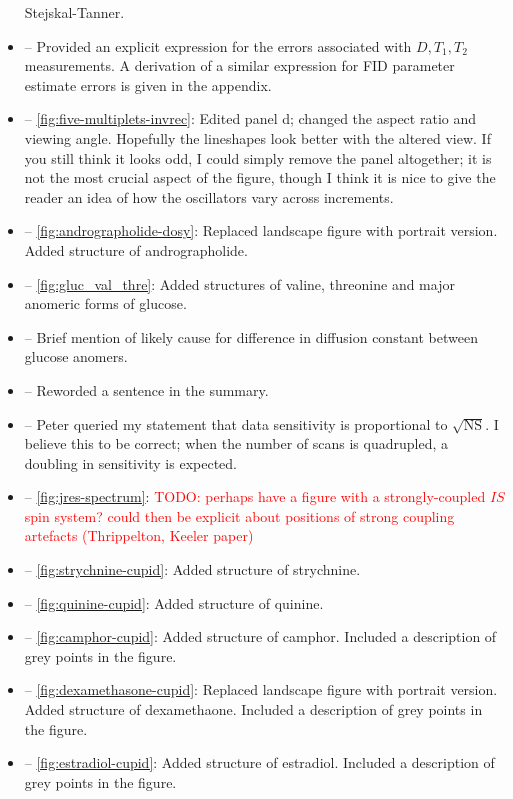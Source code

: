 \documentclass[12pt]{article}
\begin{document}
\begin{itemize}
            Stejskal-Tanner.
        \item {} -- Provided an explicit expression for
            the errors associated with $D, T_1, T_2$ measurements.
            A derivation of a similar expression for FID parameter estimate
            errors is given in the appendix.
        \item {} -- \cref{fig:five-multiplets-invrec}:
            Edited panel d; changed the aspect ratio and viewing angle.
            Hopefully the lineshapes look better with the altered view. If you
            still think it looks odd, I could simply remove the panel
            altogether; it is not the most crucial aspect of the figure, though
            I think it is nice to give the reader an idea of how the
            oscillators vary across increments.
        \item {} -- \cref{fig:andrographolide-dosy}:
            Replaced landscape figure with portrait version. Added structure of
            andrographolide.
        \item {} -- \cref{fig:gluc_val_thre}: Added
            structures of valine, threonine and major anomeric forms of glucose.
        \item {} -- Brief mention of likely cause for
            difference in diffusion constant between glucose anomers.
        \item {} -- Reworded a sentence in the summary.
        \item {} -- Peter queried my statement that data
            sensitivity is proportional to $\sqrt{\text{NS}}$. I believe this
            to be correct; when the number of scans is quadrupled, a doubling
            in sensitivity is expected.
        \item {} -- \cref{fig:jres-spectrum}: \textcolor{red}{TODO:
            perhaps have a figure with a strongly-coupled $IS$ spin system?
            could then be explicit about positions of strong coupling
        artefacts (Thrippelton, Keeler paper)}
        \item {} -- \cref{fig:strychnine-cupid}: Added
            structure of strychnine.
        \item {} -- \cref{fig:quinine-cupid}: Added structure
            of quinine.
        \item {} -- \cref{fig:camphor-cupid}: Added structure
            of camphor. Included a description of grey points in
            the figure.
        \item {} -- \cref{fig:dexamethasone-cupid}:
            Replaced landscape figure with portrait version. Added structure of
            dexamethaone. Included a description of grey points in
            the figure.
        \item {} -- \cref{fig:estradiol-cupid}: Added
            structure of estradiol. Included a description of grey points in
            the figure.
    \end{itemize}
\end{document}
